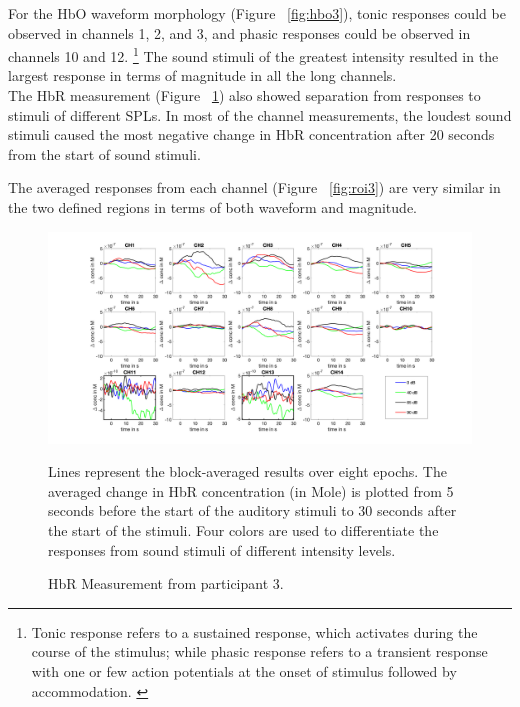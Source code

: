 For the HbO waveform morphology (Figure  ~\ref{fig:hbo3}), tonic responses could be observed in channels 1, 2, and 3, and phasic responses could be observed in channels 10 and 12. \footnote {Tonic response refers to a sustained response, which activates during the course of the stimulus; while phasic response refers to a transient response with one or few action potentials at the onset of stimulus followed by accommodation. \citep {Wang2014IonicMU}} The sound stimuli of the greatest intensity resulted in the largest response in terms of magnitude in all the long channels. \\

The HbR measurement (Figure ~\ref {fig:hbr3}) also showed separation from responses to stimuli of different SPLs. In most of the channel measurements, the loudest sound stimuli caused the most negative change in HbR concentration after 20 seconds from the start of sound stimuli. 

The averaged responses from each channel (Figure ~\ref {fig:roi3}) are very similar in the two defined regions in terms of both waveform and magnitude.

\newpage

\begin{figure}[H]
  \centering
    \includegraphics[scale=.4]{bilder/HbR_Mole/sub_jonas_s_HbR.png}
  \caption{HbR Measurement from participant 3.}
  \label{fig:hbr3}
  \medskip
  \footnotesize {Lines represent the block-averaged results over eight epochs. The averaged change in HbR concentration (in Mole) is plotted from 5 seconds before the start of the auditory stimuli to 30 seconds after the start of the stimuli. Four colors are used to differentiate the responses from sound stimuli of different intensity levels.}
\end{figure}


